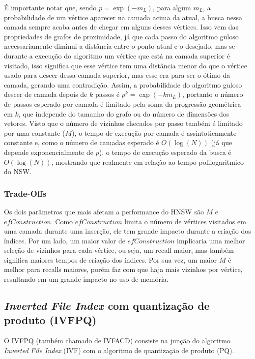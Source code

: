\documentclass[a4paper, 12pt]{article} %
\begin{document}
É importante notar que, sendo $p=\exp(-m_L)$, para algum $m_L$, a probabilidade de um vértice aparecer na camada acima da atual, a busca nessa camada sempre acaba antes de chegar em alguns desses vértices. Isso vem das propriedades de grafos de proximidade, já que cada passo do algoritmo guloso necessariamente diminui a distância entre o ponto atual e o desejado, mas se durante a execução do algoritmo um vértice que está na camada superior é visitado, isso significa que esse vértice tem uma distância menor do que o vértice usado para descer dessa camada superior, mas esse era para ser o ótimo da camada, gerando uma contradição. Assim, a probabilidade do algoritmo guloso descer de camada depois de $k$ passos é $p^k=\exp(-km_L)$, portanto o número de passos esperado por camada é limitado pela soma da progressão geométrica em $k$, que independe do tamanho do grafo ou do número de dimensões dos vetores. Visto que o número de vizinhos checados por passo também é limitado por uma constante ($M$), o tempo de execução por camada é assintoticamente constante e, como o número de camadas esperado é $O(\log(N))$ (já que depende exponencialmente de $p$), o tempo de execução esperado da busca é $O(\log(N))$, mostrando que realmente em relação ao tempo polilogaritmico do NSW.

\subsubsection{Trade-Offs}

Os dois parâmetros que mais afetam a performance do HNSW são $M$ e $efConstruction$. Como $efConstruction$ limita o número de vértices visitados em uma camada durante uma inserção, ele tem grande impacto durante a criação dos índices. Por um lado, um maior valor de $efConstruction$ implicaria uma melhor seleção de vizinhos para cada vértice, ou seja, um recall maior, mas também significa maiores tempos de criação dos índices. Por sua vez, um maior $M$ é melhor para recalls maiores, porém faz com que haja mais vizinhos por vértice, resultando em um grande impacto no uso de memória.

\subsection{\textit{Inverted File Index} com quantização de produto (IVFPQ)}

O IVFPQ (também chamado de IVFACD) consiste na junção do algoritmo \textit{Inverted File Index} (IVF) com o algoritmo de quantização de produto (PQ).
\end{document}
